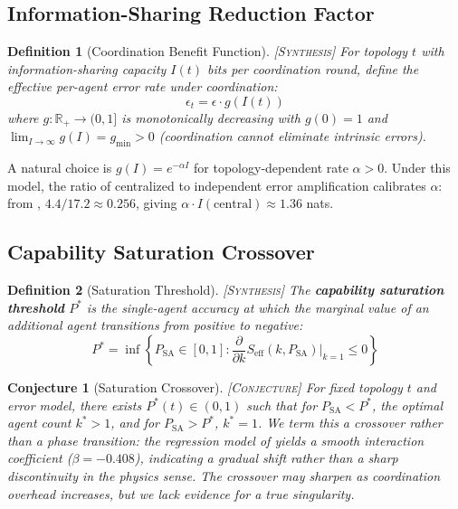 \documentclass[11pt, a4paper, copyright]{googledeepmind}
\newtheorem{definition}{Definition}[section]
\newtheorem{conjecture}[theorem]{Conjecture}
\newcommand{\synthesis}{\textsc{[Synthesis]}}
\newcommand{\conjectured}{\textsc{[Conjecture]}}
\begin{document}
\subsection{Information-Sharing Reduction Factor}

\begin{definition}[Coordination Benefit Function] \synthesis{}
\label{def:coord-benefit}
For topology $t$ with information-sharing capacity $I(t)$ bits per coordination round, define the effective per-agent error rate under coordination:
\begin{equation}
  \epsilon_t = \epsilon \cdot g(I(t))
\end{equation}
where $g: \mathbb{R}_+ \to (0, 1]$ is monotonically decreasing with $g(0) = 1$ and $\lim_{I \to \infty} g(I) = g_{\min} > 0$ (coordination cannot eliminate intrinsic errors).
\end{definition}

A natural choice is $g(I) = e^{-\alpha I}$ for topology-dependent rate $\alpha > 0$.
Under this model, the ratio of centralized to independent error amplification calibrates $\alpha$: from \citet{Kim2025}, $4.4/17.2 \approx 0.256$, giving $\alpha \cdot I(\mathrm{central}) \approx 1.36$ nats.

\subsection{Capability Saturation Crossover}

\begin{definition}[Saturation Threshold] \synthesis{}
\label{def:saturation}
The \textbf{capability saturation threshold} $P^*$ is the single-agent accuracy at which the marginal value of an additional agent transitions from positive to negative:
\begin{equation}
  P^* = \inf \left\{ P_{\mathrm{SA}} \in [0,1] : \frac{\partial}{\partial k} S_{\mathrm{eff}}(k, P_{\mathrm{SA}}) \Big|_{k=1} \leq 0 \right\}
\end{equation}
\end{definition}

\begin{conjecture}[Saturation Crossover] \conjectured{}
\label{conj:phase}
For fixed topology $t$ and error model, there exists $P^*(t) \in (0,1)$ such that for $P_{\mathrm{SA}} < P^*$, the optimal agent count $k^* > 1$, and for $P_{\mathrm{SA}} > P^*$, $k^* = 1$.
We term this a crossover rather than a phase transition: the regression model of \citet{Kim2025} yields a smooth interaction coefficient ($\beta = -0.408$), indicating a gradual shift rather than a sharp discontinuity in the physics sense. The crossover may sharpen as coordination overhead increases, but we lack evidence for a true singularity.
\end{conjecture}
\end{document}

